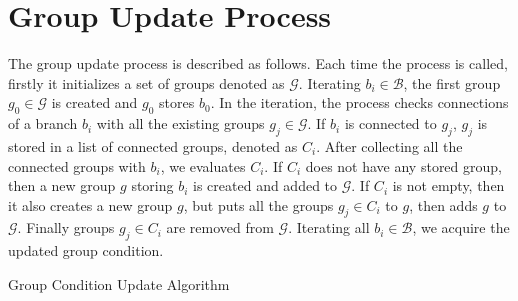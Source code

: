 \documentclass[review]{acmsiggraph}
\begin{document}
 \section{Group Update Process}
 \label{sec:group}
 The group update process is described as follows.
 Each time the process is called, firstly it initializes a set of groups denoted as $\mathcal{G}$.
 Iterating $b_i \in \mathcal{B}$, the first group $g_0 \in \mathcal{G}$ is created and $g_0$ stores $b_0$.
 In the iteration, the process checks connections of a branch $b_i$ with all the existing groups $ g_j \in \mathcal{G}$.
 If $b_i$ is connected to $g_j$, $g_j$ is stored in a list of connected groups, denoted as $C_i$.
 After collecting all the connected groups with $b_i$, we evaluates $C_i$.
 If $C_i$ does not have any stored group, then a new group $g$ storing $b_i$ is created and added to $\mathcal{G}$.
 If $C_i$ is not empty, then it also creates a new group $g$, but puts all the groups $g_j \in C_i$ to $g$, then adds $g$ to $\mathcal{G}$.
 Finally groups $g_j \in C_i$ are removed from $\mathcal{G}$.
 Iterating all $b_i \in \mathcal{B}$, we acquire the updated group condition.

 \begin{algorithm}
   \caption{Group Condition Update Algorithm}
   \begin{algorithmic}[1]
     \EndIf

           \EndIf
       \EndFor


 	\Else
 				\EndIf
 			\EndFor
 		\EndFor
 		\EndFor
 	\EndIf
 	\EndFor
   \EndFunction
   \end{algorithmic}
   \label{al:connection}
 \end{algorithm}
\end{document}
